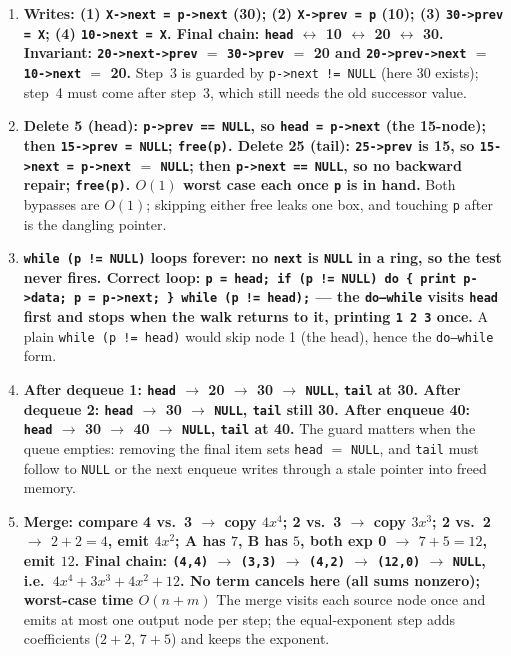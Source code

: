 \documentclass[11pt]{article}
\begin{document}
\begingroup\small
\begin{enumerate}
  \item \textbf{Writes: (1) \texttt{X->next = p->next} (30); (2) \texttt{X->prev = p} (10); (3) \texttt{30->prev = X}; (4) \texttt{10->next = X}. Final chain: \texttt{head} $\leftrightarrow$ 10 $\leftrightarrow$ 20 $\leftrightarrow$ 30. Invariant: \texttt{20->next->prev} $=$ \texttt{30->prev} $=$ 20 and \texttt{20->prev->next} $=$ \texttt{10->next} $=$ 20.} Step~3 is guarded by \texttt{p->next != NULL} (here 30 exists); step~4 must come after step~3, which still needs the old successor value.
  \item \textbf{Delete 5 (head): \texttt{p->prev == NULL}, so \texttt{head = p->next} (the 15-node); then \texttt{15->prev = NULL}; \texttt{free(p)}. Delete 25 (tail): \texttt{25->prev} is 15, so \texttt{15->next = p->next} $=$ \texttt{NULL}; then \texttt{p->next == NULL}, so no backward repair; \texttt{free(p)}. $O(1)$ worst case each once \texttt{p} is in hand.} Both bypasses are $O(1)$; skipping either free leaks one box, and touching \texttt{p} after is the dangling pointer.
  \item \textbf{\texttt{while (p != NULL)} loops forever: no \texttt{next} is \texttt{NULL} in a ring, so the test never fires. Correct loop: \texttt{p = head; if (p != NULL) do \{ print p->data; p = p->next; \} while (p != head);} --- the \texttt{do--while} visits \texttt{head} first and stops when the walk returns to it, printing \texttt{1 2 3} once.} A plain \texttt{while (p != head)} would skip node 1 (the head), hence the \texttt{do--while} form.
  \item \textbf{After dequeue 1: \texttt{head} $\to$ 20 $\to$ 30 $\to$ \texttt{NULL}, \texttt{tail} at 30. After dequeue 2: \texttt{head} $\to$ 30 $\to$ \texttt{NULL}, \texttt{tail} still 30. After enqueue 40: \texttt{head} $\to$ 30 $\to$ 40 $\to$ \texttt{NULL}, \texttt{tail} at 40.} The guard matters when the queue empties: removing the final item sets \texttt{head} $=$ \texttt{NULL}, and \texttt{tail} must follow to \texttt{NULL} or the next enqueue writes through a stale pointer into freed memory.
  \item \textbf{Merge: compare 4 vs.\ 3 $\to$ copy $4x^{4}$; 2 vs.\ 3 $\to$ copy $3x^{3}$; 2 vs.\ 2 $\to$ $2+2=4$, emit $4x^{2}$; A has $7$, B has $5$, both exp 0 $\to$ $7+5=12$, emit $12$. Final chain: \texttt{(4,4)} $\to$ \texttt{(3,3)} $\to$ \texttt{(4,2)} $\to$ \texttt{(12,0)} $\to$ \texttt{NULL}, i.e.\ $4x^{4} + 3x^{3} + 4x^{2} + 12$. No term cancels here (all sums nonzero); worst-case time $O(n+m)$ } The merge visits each source node once and emits at most one output node per step; the equal-exponent step adds coefficients ($2+2$, $7+5$) and keeps the exponent.
\end{enumerate}
\endgroup



\end{document}

